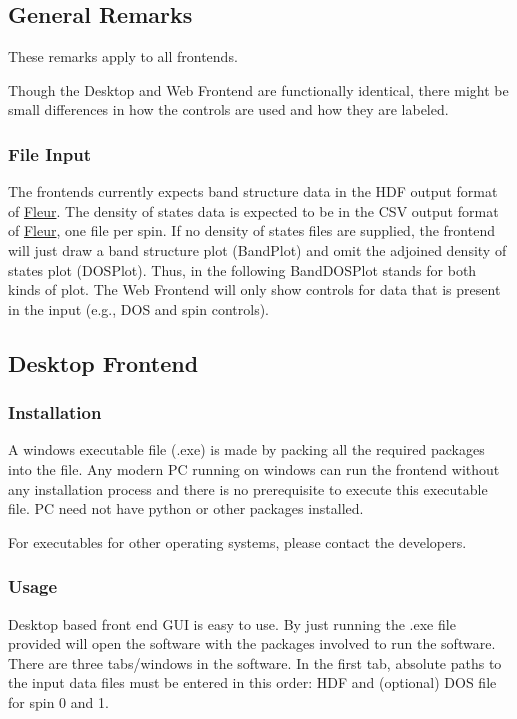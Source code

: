 \documentclass[]{article}
\begin{document}
\subsection{General Remarks}\label{general-remarks}

These remarks apply to all frontends.

Though the Desktop and Web Frontend are functionally identical, there
might be small differences in how the controls are used and how they are
labeled.

\subsubsection{File Input}\label{file-input}

The frontends currently expects band structure data in the HDF output
format of \href{http://www.judft.de}{Fleur}. The density of states data
is expected to be in the CSV output format of
\href{http://www.judft.de}{Fleur}, one file per spin. If no density of
states files are supplied, the frontend will just draw a band structure
plot (BandPlot) and omit the adjoined density of states plot (DOSPlot).
Thus, in the following BandDOSPlot stands for both kinds of plot. The
Web Frontend will only show controls for data that is present in the
input (e.g., DOS and spin controls).

\subsection{Desktop Frontend}\label{desktop-frontend}

\subsubsection{Installation}\label{installation}

A windows executable file (.exe) is made by packing all the required
packages into the file. Any modern PC running on windows can run the
frontend without any installation process and there is no prerequisite
to execute this executable file. PC need not have python or other
packages installed.

For executables for other operating systems, please contact the
developers.

\subsubsection{Usage}\label{usage}

Desktop based front end GUI is easy to use. By just running the .exe
file provided will open the software with the packages involved to run
the software. There are three tabs/windows in the software. In the first
tab, absolute paths to the input data files must be entered in this
order: HDF and (optional) DOS file for spin 0 and 1.
\end{document}
